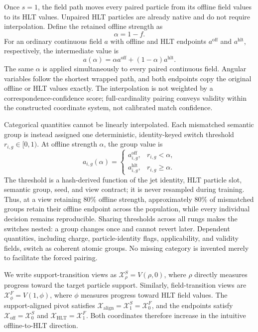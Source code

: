 \documentclass[11pt]{article}
\newcommand{\xoff}{\mathcal{X}_{\mathrm{off}}}
\newcommand{\xalign}{\mathcal{X}_{\mathrm{align}}}
\newcommand{\xhlt}{\mathcal{X}_{\mathrm{HLT}}}
\newcommand{\xsupp}[1]{\mathcal{X}^{S}_{#1}}
\newcommand{\xfield}[1]{\mathcal{X}^{F}_{#1}}
\begin{document}
Once $s=1$, the field path moves every paired particle from its offline field
values to its HLT values.  Unpaired HLT particles are already native and do
not require interpolation.  Define the retained offline strength as
\begin{equation}
    \alpha = 1-f.
    \label{eq:offline-strength}
\end{equation}
For an ordinary continuous field $a$ with offline and HLT endpoints
$a^{\mathrm{off}}$ and $a^{\mathrm{hlt}}$, respectively, the intermediate
value is
\begin{equation}
    a(\alpha)
    = \alpha a^{\mathrm{off}}
      +(1-\alpha)a^{\mathrm{hlt}}.
    \label{eq:continuous-interpolation}
\end{equation}
The same $\alpha$ is applied simultaneously to every paired continuous field.
Angular variables follow the shortest wrapped path, and both endpoints copy
the original offline or HLT values exactly.  The interpolation is not weighted
by a correspondence-confidence score; full-cardinality pairing conveys
validity within the constructed coordinate system, not calibrated match
confidence.

Categorical quantities cannot be linearly interpolated.  Each mismatched
semantic group is instead assigned one deterministic, identity-keyed switch
threshold $r_{i,g}\in[0,1)$.  At offline strength $\alpha$, the group value is
\begin{equation}
    a_{i,g}(\alpha) =
    \begin{cases}
        a_{i,g}^{\mathrm{off}}, & r_{i,g}<\alpha,\\
        a_{i,g}^{\mathrm{hlt}}, & r_{i,g}\geq\alpha.
    \end{cases}
    \label{eq:discrete-switch}
\end{equation}
The threshold is a hash-derived function of the jet identity, HLT particle
slot, semantic group, seed, and view contract; it is never resampled during
training.  Thus, at a view retaining $80\%$ offline strength, approximately
$80\%$ of mismatched groups retain their offline endpoint across the
population, while every individual decision remains reproducible.  Sharing
thresholds across all rungs makes the switches nested: a group changes once
and cannot revert later.  Dependent quantities, including charge,
particle-identity flags, applicability, and validity fields, switch as
coherent atomic groups.  No missing category is invented merely to facilitate
the forced pairing.

We write support-transition views as
$\xsupp{\rho}=V(\rho,0)$, where $\rho$ directly measures progress toward the
target particle support.  Similarly, field-transition views are
$\xfield{\phi}=V(1,\phi)$, where $\phi$ measures progress toward HLT field
values.  The support-aligned pivot satisfies
$\xalign=\xsupp{1}=\xfield{0}$, and the endpoints satisfy
$\xoff=\xsupp{0}$ and $\xhlt=\xfield{1}$.  Both coordinates therefore increase
in the intuitive offline-to-HLT direction.
\end{document}
